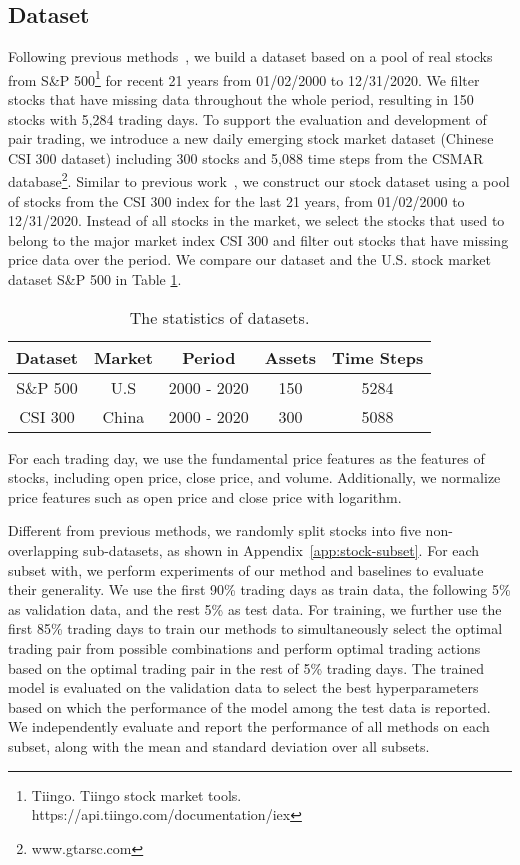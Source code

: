 \documentclass[sigconf]{acmart}
\begin{document}
\subsection{Dataset}
Following previous methods~\cite{Krauss2017}, we build a dataset based on a pool of real stocks from S\&P 500\footnote{Tiingo. Tiingo stock market tools. https://api.tiingo.com/documentation/iex} for recent 21 years from 01/02/2000 to 12/31/2020.
We filter stocks that have missing data throughout the whole period, resulting in 150 stocks with 5,284 trading days.
To support the evaluation and development of pair trading, we introduce a new daily emerging stock market dataset (Chinese CSI 300 dataset) including 300 stocks and 5,088 time steps from the CSMAR database\footnote{www.gtarsc.com}.
Similar to previous work~\cite{Krauss2017}, we construct our stock dataset using a pool of stocks from the CSI 300 index for the last 21 years, from 01/02/2000 to 12/31/2020.
Instead of all stocks in the market, we select the stocks that used to belong to the major market index CSI 300 and filter out stocks that have missing price data over the period.
We compare our dataset and the U.S. stock market dataset S\&P 500 in Table \ref{tab:data-statistics}.
\begin{table}[htp]
\centering
\begin{tabular}{@{}ccccc@{}}
\toprule
Dataset & Market & Period & Assets & Time Steps \\ \midrule
S\&P 500 & U.S & 2000 - 2020 & 150 & 5284 \\\midrule
CSI 300 & China & 2000 - 2020 & 300 & 5088 \\ \bottomrule
\end{tabular}
\caption{The statistics of datasets.}
\label{tab:data-statistics}
\end{table}

For each trading day, we use the fundamental price features as the features of stocks, including open price, close price, and volume.
Additionally, we normalize price features such as open price and close price with logarithm.

Different from previous methods, we randomly split stocks into five non-overlapping sub-datasets, as shown in Appendix~\ref{app:stock-subset}.
For each subset with, we perform experiments of our method and baselines to evaluate their generality.
We use the first 90\% trading days as train data, the following 5\% as validation data, and the rest 5\% as test data.
For training, we further use the first 85\% trading days to train our methods to simultaneously select the optimal trading pair from  possible combinations and perform optimal trading actions based on the optimal trading pair in the rest of 5\% trading days.
The trained model is evaluated on the validation data to select the best hyperparameters based on which the performance of the model among the test data is reported.
We independently evaluate and report the performance of all methods on each subset, along with the mean and standard deviation over all subsets.
	
\end{document}
